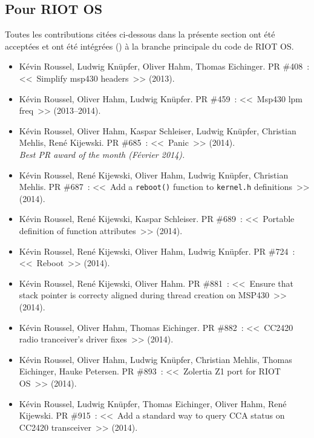 \subsection*{Pour RIOT OS}

Toutes les contributions citées ci-dessous dans la présente section
ont été acceptées et ont été intégrées ()
à la branche principale du code de RIOT OS.


\begin{itemize}

\item Kévin Roussel, Ludwig Knüpfer, Oliver Hahm, Thomas Eichinger.
PR \#408~: <<~Simplify msp430 headers~>>
(2013).

\item Kévin Roussel, Oliver Hahm, Ludwig Knüpfer.
PR \#459~: <<~Msp430 lpm freq~>>
(2013--2014).

\item Kévin Roussel, Oliver Hahm, Kaspar Schleiser, Ludwig Knüpfer,
      Christian Mehlis, René Kijewski.
PR \#685~: <<~Panic~>>
(2014).\\
\emph{Best PR award of the month (Février 2014).}

\item Kévin Roussel, René Kijewski, Oliver Hahm, Ludwig Knüpfer,
      Christian Mehlis.
PR \#687~: <<~Add a \texttt{reboot()} function to \texttt{kernel.h}
              definitions~>>
(2014).

\item Kévin Roussel, René Kijewski, Kaspar Schleiser.
PR \#689~: <<~Portable definition of function attributes~>>
(2014).

\item Kévin Roussel, René Kijewski, Oliver Hahm, Ludwig Knüpfer.
PR \#724~: <<~Reboot~>>
(2014).

\item Kévin Roussel, René Kijewski, Oliver Hahm.
PR \#881~: <<~Ensure that stack pointer is correcty aligned during
              thread creation on MSP430~>>
(2014).

\item Kévin Roussel, Oliver Hahm, Thomas Eichinger.
PR \#882~: <<~CC2420 radio tranceiver's driver fixes~>>
(2014).

\item Kévin Roussel, Oliver Hahm, Ludwig Knüpfer, Christian Mehlis,
      Thomas Eichinger, Hauke Petersen.
PR \#893~: <<~Zolertia Z1 port for RIOT OS~>>
(2014).

\item Kévin Roussel, Ludwig Knüpfer, Thomas Eichinger, Oliver Hahm,
      René Kijewski.
PR \#915~: <<~Add a standard way to query CCA status on CC2420 transceiver~>>
(2014).


\end{itemize}
